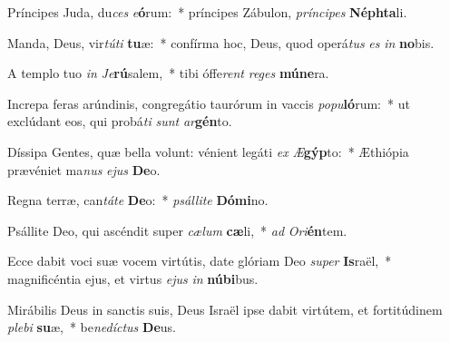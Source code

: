 \item Príncipes Juda, du\textit{ces} \textit{e}\textbf{ó}rum:~* príncipes Zábulon, \textit{prín}\textit{ci}\textit{pes} \textbf{Néph}\textbf{ta}li.
\item Manda, Deus, vir\textit{tú}\textit{ti} \textbf{tu}æ:~* confírma hoc, Deus, quod operá\textit{tus} \textit{es} \textit{in} \textbf{no}bis.
\item A templo tuo \textit{in} \textit{Je}\textbf{rú}salem,~* tibi óffe\textit{rent} \textit{re}\textit{ges} \textbf{mú}\textbf{ne}ra.
\item Increpa feras arúndinis, congregátio taurórum in vaccis \textit{po}\textit{pu}\textbf{ló}rum:~* ut exclúdant eos, qui probá\textit{ti} \textit{sunt} \textit{ar}\textbf{gén}to.
\item Díssipa Gentes, quæ bella volunt: vénient legáti \textit{ex} \textit{Æ}\textbf{gýp}to:~* Æthiópia prævéniet ma\textit{nus} \textit{e}\textit{jus} \textbf{De}o.
\item Regna terræ, can\textit{tá}\textit{te} \textbf{De}o:~* \textit{psál}\textit{li}\textit{te} \textbf{Dó}\textbf{mi}no.
\item Psállite Deo, qui ascéndit super \textit{cæ}\textit{lum} \textbf{cæ}li,~* \textit{ad} \textit{O}\textit{ri}\textbf{én}tem.
\item Ecce dabit voci suæ vocem virtútis, date glóriam Deo \textit{su}\textit{per} \textbf{Is}raël,~* magnificéntia ejus, et virtus \textit{e}\textit{jus} \textit{in} \textbf{nú}\textbf{bi}bus.
\item Mirábilis Deus in sanctis suis, Deus Israël ipse dabit virtútem, et fortitúdinem \textit{ple}\textit{bi} \textbf{su}æ,~* be\textit{ne}\textit{díc}\textit{tus} \textbf{De}us.
